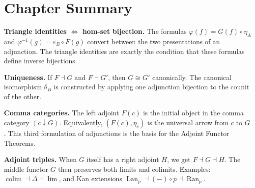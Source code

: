 \begin{exercisesbox}
\begin{qa}
\end{qa}
\end{exercisesbox}


\section*{Chapter Summary}

\begin{summarybox}
\textbf{Triangle identities $\Leftrightarrow$ hom-set bijection.} The formulas
$\varphi(f) = G(f) \circ \eta_A$ and $\varphi^{-1}(g) = \varepsilon_B \circ F(g)$
convert between the two presentations of an adjunction. The triangle identities
are exactly the condition that these formulas define inverse bijections.

\textbf{Uniqueness.} If $F \dashv G$ and $F \dashv G'$, then $G \cong G'$
canonically. The canonical isomorphism $\theta_B$ is constructed by applying
one adjunction bijection to the counit of the other.

\textbf{Comma categories.} The left adjoint $F(c)$ is the initial object in
the comma category $(c \downarrow G)$. Equivalently, $(F(c), \eta_c)$ is the
universal arrow from $c$ to $G$. This third formulation of adjunctions is the
basis for the Adjoint Functor Theorems.

\textbf{Adjoint triples.} When $G$ itself has a right adjoint $H$, we get
$F \dashv G \dashv H$. The middle functor $G$ then preserves both limits and
colimits. Examples: $\operatorname{colim} \dashv \Delta \dashv \lim$, and Kan
extensions $\operatorname{Lan}_p \dashv (-) \circ p \dashv \operatorname{Ran}_p$.
\end{summarybox}


